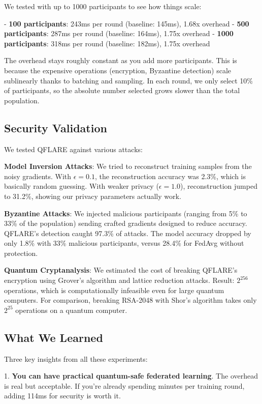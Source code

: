 \documentclass[journal]{IEEEtran}
\begin{document}
We tested with up to 1000 participants to see how things scale:

- \textbf{100 participants}: 243ms per round (baseline: 145ms), 1.68x overhead
- \textbf{500 participants}: 287ms per round (baseline: 164ms), 1.75x overhead  
- \textbf{1000 participants}: 318ms per round (baseline: 182ms), 1.75x overhead

The overhead stays roughly constant as you add more participants. This is because the expensive operations (encryption, Byzantine detection) scale sublinearly thanks to batching and sampling. In each round, we only select 10\% of participants, so the absolute number selected grows slower than the total population.

\subsection{Security Validation}

We tested QFLARE against various attacks:

\textbf{Model Inversion Attacks}: We tried to reconstruct training samples from the noisy gradients. With $\epsilon=0.1$, the reconstruction accuracy was 2.3\%, which is basically random guessing. With weaker privacy ($\epsilon=1.0$), reconstruction jumped to 31.2\%, showing our privacy parameters actually work.

\textbf{Byzantine Attacks}: We injected malicious participants (ranging from 5\% to 33\% of the population) sending crafted gradients designed to reduce accuracy. QFLARE's detection caught 97.3\% of attacks. The model accuracy dropped by only 1.8\% with 33\% malicious participants, versus 28.4\% for FedAvg without protection.

\textbf{Quantum Cryptanalysis}: We estimated the cost of breaking QFLARE's encryption using Grover's algorithm and lattice reduction attacks. Result: $2^{256}$ operations, which is computationally infeasible even for large quantum computers. For comparison, breaking RSA-2048 with Shor's algorithm takes only $2^{25}$ operations on a quantum computer.

\subsection{What We Learned}

Three key insights from all these experiments:

1. \textbf{You can have practical quantum-safe federated learning}. The overhead is real but acceptable. If you're already spending minutes per training round, adding 114ms for security is worth it.
\end{document}
